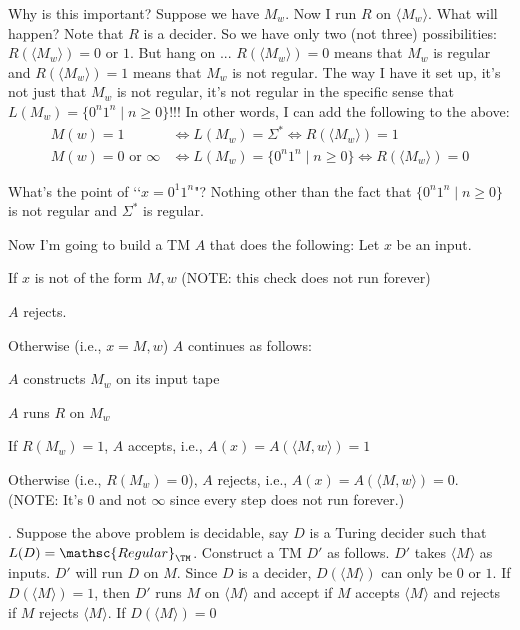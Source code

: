 Why is this important?
Suppose we have $M_w$.
Now I run $R$ on $\langle M_w \rangle$.
What will happen?
Note that $R$ is a decider.
So we have only two (not three) possibilities:
$R(\langle M_w \rangle) = 0$ or $1$.
But hang on ...
$R(\langle M_w \rangle) = 0$ means that $M_w$ is regular and 
$R(\langle M_w \rangle) = 1$ means that $M_w$ is not regular.
The way I have it set up, it's not just that $M_w$ is not
regular, it's not regular in the specific sense that
$L(M_w) = \{0^n 1^n \mid n \geq 0\}$!!!
In other words,
I can add the following to the above:
\begin{align*}
M(w) = 1 &\iff L(M_w) = \Sigma^* \iff R(\langle M_w\rangle) = 1\\
M(w) = 0 \text{ or } \infty &\iff L(M_w) = \{ 0^n1^n \mid n \geq 0 \}
\iff R(\langle M_w\rangle) = 0
\end{align*}

What's the point of \lq\lq $x = 0^1 1^n$"?
Nothing other than the fact that $\{0^n 1^n \mid n \geq 0\}$
is not regular and $\Sigma^*$ is regular.

Now I'm going to build a TM $A$ that does the following:
Let $x$ be an input.
\begin{tightlist}
\item If $x$ is not of the form $M,w$ (NOTE: this check does not run
  forever)
  \begin{tightlist}
  \item $A$ rejects.
  \end{tightlist}
\item Otherwise (i.e., $x = M,w$) $A$ continues as follows:
  \begin{tightlist}
  \item $A$ constructs $M_w$ on its input tape
  \item $A$ runs $R$ on $M_w$
  \item If $R(M_w) = 1$, $A$ accepts, i.e., $A(x) = A(\langle M, w\rangle) = 1$
  \item Otherwise (i.e., $R(M_w) = 0$), $A$ rejects, i.e.,
    $A(x) = A(\langle M, w\rangle) = 0$.
    (NOTE: It's $0$ and not $\infty$ since
    every step does not run forever.)
  \end{tightlist}
\end{tightlist}

\SOLUTION.
Suppose the above problem is decidable,
say $D$ is a Turing decider such that $L(D) = \mathsc{Regular}_\TM$.
Construct a TM $D'$ as follows. $D'$ takes $\langle M \rangle$ as inputs.
$D'$ will run $D$ on $M$.
Since $D$ is a decider, $D(\langle M \rangle)$ can only be $0$ or $1$.
If $D(\langle M \rangle) = 1$, then $D'$ runs $M$ on $\langle M \rangle$
and accept if $M$ accepts $\langle M \rangle$
and rejects if $M$ rejects $\langle M \rangle$.
If $D(\langle M \rangle) = 0$
